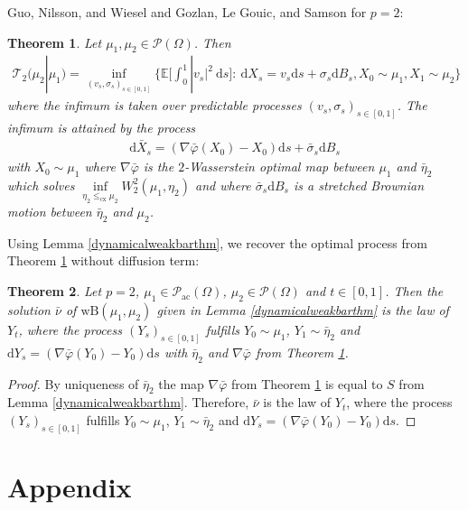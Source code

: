\documentclass[10pt,a4paper]{amsart}
\newcommand{\dd}{\mathrm{d}}
\newtheorem{thm}{Theorem}[section]
\begin{document}
Guo, Nilsson, and Wiesel \cite{guo2026} and Gozlan, Le Gouic, and Samson \cite{gozlan2025} for $p=2$:
\begin{thm}\cite[Thm 2]{guo2026}\cite[Thm 9]{gozlan2025}\label{guoweakbbthm}
	Let $\mu_1,\mu_2\in\mathcal P(\Omega)$. Then
	\begin{gather*}
		\mathcal T_2(\mu_2|\mu_1)=\inf_{(v_s,\sigma_s)_{s\in[0,1]}}\Big\{\mathbb{E}\Big[\int_0^1|v_s|^2\ \dd s\Big]:\ \dd X_s=v_s\dd s+\sigma_s\dd B_s, X_0\sim\mu_1,X_1\sim\mu_2\Big\}
	\end{gather*}
	where the infimum is taken over predictable processes $(v_s,\sigma_s)_{s\in[0,1]}$.
	The infimum is attained by the process
	\begin{gather*}
		\dd \bar X_s=(\nabla\bar\varphi(X_0)-X_0)\dd s+\bar\sigma_s\dd B_s
	\end{gather*}
	with $X_0\sim\mu_1$
	where $\nabla\bar\varphi$ is the $2$-Wasserstein optimal map between $\mu_1$ and $\bar\eta_2$ which solves $\inf\limits_{\eta_2\leq_{\text{cx}}\mu_2}W_2^2(\mu_1,\eta_2)$ and where $\bar\sigma_s\dd B_s$ is a stretched Brownian motion between $\bar\eta_2$ and $\mu_2$.
\end{thm}
Using Lemma \ref{dynamicalweakbarthm}, we recover the optimal process from Theorem \ref{guoweakbbthm} without diffusion term:
\begin{thm}\label{weakBBrelthm}
	Let $p=2$, $\mu_1\in\mathcal P_{\text{ac}}(\Omega)$, $\mu_2\in\mathcal P(\Omega)$ and $t\in[0,1]$.
	Then the solution $\bar\nu$ of $\text{wB}(\mu_1,\mu_2)$ given in Lemma \ref{dynamicalweakbarthm} is the law of $Y_t$, where the process $(Y_s)_{s\in[0,1]}$ fulfills $Y_0\sim\mu_1$, $Y_1\sim\bar\eta_2$ and $\dd Y_s=(\nabla\bar\varphi(Y_0)-Y_0)\dd s$ with $\bar\eta_2$ and $\nabla\bar\varphi$ from Theorem \ref{guoweakbbthm}.
\end{thm}
\begin{proof}
	By uniqueness of $\bar\eta_2$ the map $\nabla\bar\varphi$ from Theorem \ref{guoweakbbthm} is equal to $S$ from Lemma \ref{dynamicalweakbarthm}. Therefore, $\bar\nu$ is the law of $Y_t$, where the process $(Y_s)_{s\in[0,1]}$ fulfills $Y_0\sim\mu_1$, $Y_1\sim\bar\eta_2$ and $\dd Y_s=(\nabla\bar\varphi(Y_0)-Y_0)\dd s$.
\end{proof}
\section{Appendix}
\end{document}

